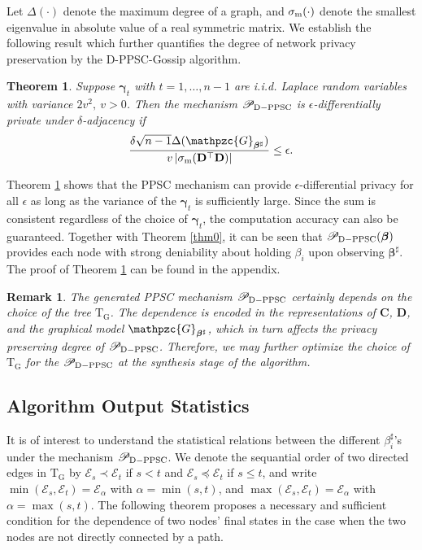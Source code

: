 \documentclass[a4paper, 11pt]{article}
\newcommand{\1}{\mathbf{1}}
\newcommand{\asf}{\mathcal{E}}
\newcommand{\Db}{\mathbf{D}}
\newcommand{\mG}{\mathrm{G}}
\newcommand{\mGM}{\mathpzc{G}}
\newcommand{\gammab}{{\bm \gamma}}
\newcommand{\betab}{\bm{\beta}}
\newcommand{\sigm}{\sigma_{\rm m}}
\newtheorem{theorem}{Theorem}
\newtheorem{remark}{Remark}
\begin{document}
Let $\Delta(\cdot)$ denote the maximum degree of a graph, and $\sigm(\cdot)$ denote the smallest eigenvalue in absolute value of a real symmetric matrix. We establish the following result which further quantifies the degree of network privacy preservation by the D-PPSC-Gossip algorithm. 
\begin{theorem}\label{thmdp}
	Suppose $\gammab_t$ with $t=1,\dots,n-1 $ are i.i.d. Laplace random variables with variance $2v^2,\ v>0$. Then the   mechanism $\mathscr{P}_{\rm D-PPSC}$ is $\epsilon$-differentially private under $\delta$-adjacency if 
	$$
	\frac{\delta\sqrt{n-1}\Delta(\mGM_{\betab^\sharp})}{v\left|\sigm(\Db^\top\Db)\right|}\le\epsilon.  
	$$
\end{theorem}

Theorem \ref{thmdp} shows that the PPSC mechanism can provide $\epsilon$-differential privacy  for all $\epsilon$ as long as the variance of the $\gammab_t$ is sufficiently large. Since the sum is consistent regardless of the choice of $\gammab_t$, the computation accuracy can also be guaranteed. Together with Theorem \ref{thm0}, it can be seen that $\mathscr{P}_{\rm D-PPSC}(\betab)$ provides each node with strong deniability about holding $\beta_i$ upon observing $\betab^\sharp$. The proof of Theorem   \ref{thmdp} can be found in the appendix. 


\begin{remark}{\rm 
The generated  PPSC mechanism  $\mathscr{P}_{\rm D-PPSC} $  certainly depends on the choice of the tree  $\mathrm{T}_{\mG}$. The dependence is encoded in the representations of $\mathbf{C}$, $\mathbf{D}$, and the graphical model $\mGM_{\betab^\sharp}$, which in turn affects the privacy preserving degree of  $\mathscr{P}_{\rm D-PPSC} $. Therefore, we may further optimize   the choice of   $\mathrm{T}_{\mG}$ for the $\mathscr{P}_{\rm D-PPSC} $ at the synthesis stage of the algorithm. }
\end{remark}




\subsection{Algorithm  Output Statistics}
 It is of interest to understand the statistical relations between the different  $\beta^\sharp_i$'s under the mechanism $\mathscr{P}_{\rm D-PPSC}$.  We denote the sequantial order of two directed edges  in $\mathrm{T}_{\mG}$ by $\asf_s\prec\asf_t$ if $s<t$ and $\asf_s\preceq\asf_t$ if $s\le t$, and write $\min(\asf_s,\asf_t)=\asf_{\alpha}$ with $\alpha=\min(s,t)$, and $\max(\asf_s,\asf_t)=\asf_{\alpha}$ with $\alpha=\max(s,t)$.
The following theorem proposes a necessary and sufficient condition for the dependence of two nodes' final states in the case when the two nodes are not directly connected by a path.
\end{document}

